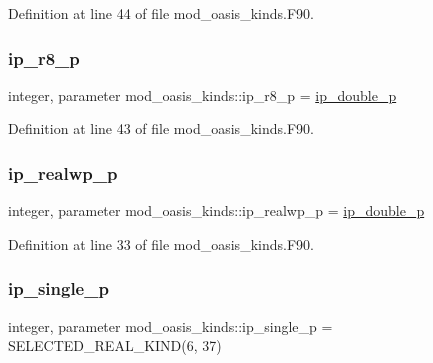 Definition at line 44 of file mod\+\_\+oasis\+\_\+kinds.\+F90.

\mbox{\label{namespacemod__oasis__kinds_a6129e979d32b55cb020fb76068ce9808}} 
\subsubsection{\texorpdfstring{ip\+\_\+r8\+\_\+p}{ip\_r8\_p}}
{\footnotesize\ttfamily integer, parameter mod\+\_\+oasis\+\_\+kinds\+::ip\+\_\+r8\+\_\+p = \hyperlink{namespacemod__oasis__kinds_aff0b6e4604e7a60178eeca47edec1460}{ip\+\_\+double\+\_\+p}}



Definition at line 43 of file mod\+\_\+oasis\+\_\+kinds.\+F90.

\mbox{\label{namespacemod__oasis__kinds_a3875d67b4b579bb15696c55b5547d3c4}} 
\subsubsection{\texorpdfstring{ip\+\_\+realwp\+\_\+p}{ip\_realwp\_p}}
{\footnotesize\ttfamily integer, parameter mod\+\_\+oasis\+\_\+kinds\+::ip\+\_\+realwp\+\_\+p = \hyperlink{namespacemod__oasis__kinds_aff0b6e4604e7a60178eeca47edec1460}{ip\+\_\+double\+\_\+p}}



Definition at line 33 of file mod\+\_\+oasis\+\_\+kinds.\+F90.

\mbox{\label{namespacemod__oasis__kinds_a298ab0c96a80ba12ba8969e6bcd186ed}} 
\subsubsection{\texorpdfstring{ip\+\_\+single\+\_\+p}{ip\_single\_p}}
{\footnotesize\ttfamily integer, parameter mod\+\_\+oasis\+\_\+kinds\+::ip\+\_\+single\+\_\+p = S\+E\+L\+E\+C\+T\+E\+D\+\_\+\+R\+E\+A\+L\+\_\+\+K\+I\+ND(6, 37)}



